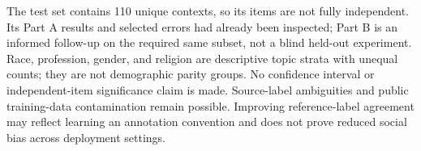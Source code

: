 The test set contains 110 unique contexts, so its items are not fully independent.
Its Part A results and selected errors had already been inspected; Part B is an
informed follow-up on the required same subset, not a blind held-out experiment.
Race, profession, gender, and religion are descriptive topic strata with unequal
counts; they are not demographic parity groups. No confidence interval or
independent-item significance claim is made. Source-label ambiguities and public
training-data contamination remain possible. Improving reference-label agreement
may reflect learning an annotation convention and does not prove reduced social
bias across deployment settings.
